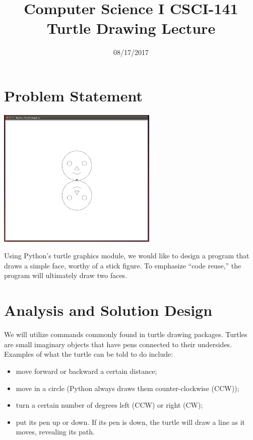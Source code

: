 \documentclass[pdftex,12pt]{artikel3}
\title{Computer Science I \hfill CSCI-141\\
Turtle Drawing \hfill Lecture}
\author{} %
\date{}   %
\begin{document}
\vspace{-27mm}
\maketitle

\vspace{-27mm}
\begin{tiny}
\hfill \date{08/17/2017}
\end{tiny}
\vspace{-6mm}

\section{Problem Statement}

\begin{center}
\includegraphics[width=3.0in]{Faces.png} 
\end{center}

Using Python's turtle graphics module, we would like to design a
program that draws a simple face, worthy of a stick figure.  To
emphasize ``code reuse,'' the program will ultimately draw two faces.


\section{Analysis and Solution Design}

We will utilize commands commonly found in turtle drawing packages. 
Turtles are small imaginary objects that have pens 
connected to their undersides. 
Examples of what the turtle can be told to do include:
\begin{itemize}
\item
move forward or backward a certain distance;
\item
move in a circle (Python always draws them counter-clockwise (CCW));
\item
turn a certain number of degrees left (CCW) or right (CW);
\item
put its pen up or down. If its pen is down, 
the turtle will draw a line as it moves, revealing its path.
\end{itemize}
\end{document}
